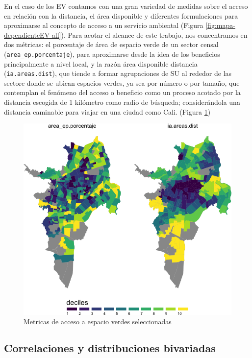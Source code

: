 \documentclass[12pt,]{book}
\begin{document}
En el caso de los EV contamos con una gran variedad de medidas sobre el
acceso en relación con la distancia, el área disponible y diferentes
formulaciones para aproximarse al concepto de acceso a un servicio
ambiental (Figura \ref{fig:mapa-dependienteEV-all}). Para acotar el
alcance de este trabajo, nos concentramos en dos métricas: el porcentaje
de área de espacio verde de un sector censal
(\texttt{area\_ep.porcentaje}), para aproximarse desde la idea de los
beneficios principalmente a nivel local, y la razón área disponible
distancia (\texttt{ia.areas.dist}), que tiende a formar agrupaciones de
SU al rededor de las sectore donde se ubican espacios verdes, ya sea por
número o por tamaño, que contemplan el fenómeno del acceso o beneficio
como un proceso acotado por la distancia escogida de 1 kilómetro como
radio de búsqueda; considerándola una distancia caminable para viajar en
una ciudad como Cali. (Figura \ref{fig:mapa-dependienteEV-sel})

\begin{figure}
\includegraphics[width=1\linewidth]{tesis-unigis_files/figure-latex/mapa-dependienteEV-sel-1} \caption{Metricas de acceso a espacio verdes seleccionadas}\label{fig:mapa-dependienteEV-sel}
\end{figure}

\subsection{Correlaciones y distribuciones
bivariadas}\label{correlaciones-y-distribuciones-bivariadas}
\end{document}
